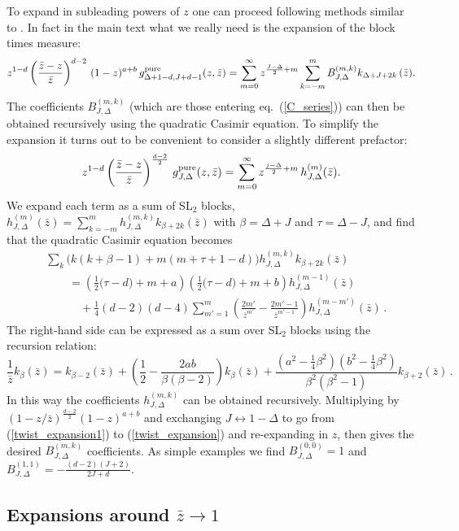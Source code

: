 \documentclass[11pt, reqno,preprint]{article}
\def\be{\begin{equation}}
\def\ee{\end{equation}}
\def\gpure{g^{\rm pure}}
\def\zbar{\bar{z}}
\def\j{J}
\begin{document}
\begin{appendix}
To expand in subleading powers of $z$ one can proceed following methods similar to \cite{Dolan:2003hv}.
In fact in the main text what we really need is the expansion of the block times measure:
\be
z^{1-d}\left(\frac{\zbar-z}{\zbar}\right)^{d-2}\,(1-z)^{a+b}\,\gpure_{\Delta+1-d,\j+d-1}(z,\zbar) =
\sum_{m=0}^\infty z^{\frac{\j-\Delta}{2}+m} \sum_{k=-m}^m B^{(m,k)}_{\j,\Delta} k_{\Delta+\j+2k}\,(\zbar). \label{twist_expansion}
\ee
The coefficients $B^{(m,k)}_{\j,\Delta}$ (which are those entering eq.~(\ref{C_series}))
can then be obtained recursively using the quadratic Casimir equation.
To simplify the expansion it turns out to be convenient to consider a slightly different prefactor:
\be
z^{1-d}\left(\frac{\zbar-z}{\zbar}\right)^{\frac{d-2}{2}}\,\gpure_{\j,\Delta}(z,\zbar) =
\sum_{m=0}^\infty z^{\frac{j-\Delta}{2}+m} \,h^{(m)}_{\j,\Delta}(\zbar). \label{twist_expansion1}
\ee
We expand each term as a sum of SL${}_2$ blocks, $h_{\j,\Delta}^{(m)}(\zbar)=\sum_{k=-m}^m h_{\j,\Delta}^{(m,k)} k_{\beta+2k}(\zbar)$
with $\beta=\Delta+\j$ and $\tau=\Delta-\j$, and find that the quadratic Casimir equation becomes
\be\begin{aligned}
&\sum_k \big(k(k+\beta-1)+m(m+\tau+1-d)\big)h_{\j,\Delta}^{(m,k)} k_{\beta+2k}(\zbar)
\\ &\qquad =
\left(\tfrac12\big(\tau-d\big)+m+a\right)\left(\tfrac12\big(\tau-d\big)+m+b\right) h_{\j,\Delta}^{(m-1)}(\zbar)
\\ & \qquad \quad + \tfrac14(d-2)(d-4)
\sum_{m'=1}^m\left( \frac{2m'}{\zbar^{m'}}-\frac{2m'-1}{\zbar^{m'-1}}\right) h_{\j,\Delta}^{(m-m')}(\zbar)\,.
\end{aligned}\ee
The right-hand side can be expressed as a sum over SL${}_2$ blocks using the recursion relation:
\be
\frac{1}{\zbar} k_\beta(\zbar) = k_{\beta-2}(\zbar)+ \left(\frac12-\frac{2ab}{\beta(\beta-2)}\right)k_\beta(\zbar)+ \frac{(a^2-\tfrac14\beta^2)(b^2-\tfrac14\beta^2)}{\beta^2(\beta^2-1)}k_{\beta+2}(\zbar)\,.
\ee
In this way the coefficients $h_{\j,\Delta}^{(m,k)}$ can be obtained recursively.  Multiplying by $(1-z/\zbar)^{\frac{d-2}{2}}(1-z)^{a+b}$
and exchanging $\j\leftrightarrow 1-\Delta$ to go from (\ref{twist_expansion1}) to (\ref{twist_expansion}) and re-expanding in $z$,
then gives the desired $B^{(m,k)}_{\j,\Delta}$ coefficients.
As simple examples we find $B^{(0,0)}_{\j,\Delta}=1$ and $B^{(1,1)}_{\j,\Delta}=-\frac{(d-2)(\j+2)}{2\j+d}$.

\subsection{Expansions around $\zbar\to 1$}\label{app:cross}


\end{appendix}
\end{document}
